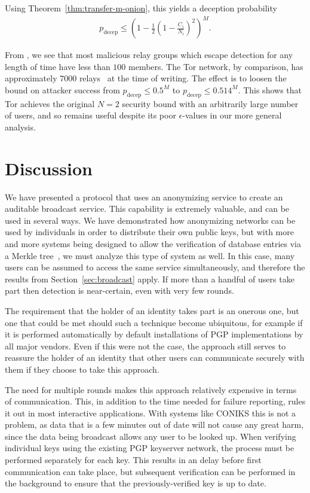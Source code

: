 \documentclass[USenglish]{llncs}
\begin{document}
Using Theorem~\ref{thm:transfer-m-onion}, this yields a deception probability
\begin{align}
	p_\mathrm{decep} \le \left( 1-\frac{1}{2}\left(1-\frac{C_i}{N_i}\right)^2 \right)^M .
\end{align}

From \cite[Table~2]{sybilhunter}, we see that most malicious relay groups
which escape detection for any length of time have less than $100$ members.
The Tor network, by comparison, has approximately $7000$ relays~\cite{tormetrics}
at the time of writing.  The effect is to loosen the bound on attacker success from
$p_\mathrm{decep} \le 0.5^{M}$ to $p_\mathrm{decep} \le 0.514^M$.  This shows that
Tor achieves the original $N=2$ security bound with an arbitrarily large number of users, and
so remains useful despite its poor $\epsilon$-values in our more general analysis.

\section{Discussion}

We have presented a protocol that uses an anonymizing service to create
an auditable broadcast service.  This capability is extremely valuable, and can
be used in several ways.  We have demonstrated how anonymizing networks
can be used by individuals in order to distribute their own public keys, but
with more and more systems being designed to allow the verification of database
entries via a Merkle tree~\cite{laurie-transparency,keybase,coniks}, we
must analyze this type of system as well.
In this case, many users can be assumed to
access the same service simultaneously, and therefore the results from
Section~\ref{sec:broadcast} apply.  If more than a handful of users take part
then detection is near-certain, even with very few rounds.

The requirement that the holder of an identity takes part is an onerous one,
but one that could be met should such a technique become ubiquitous, for
example if it is performed automatically by default installations of PGP
implementations by all major vendors.  Even if this were not the case, the
approach still serves to reassure the holder of an identity that other users
can communicate securely with them if they choose to take this approach.

The need for multiple rounds makes this approach relatively expensive in
terms of communication.  This, in addition to the time needed for
failure reporting, rules it out in most interactive applications.  With systems like
CONIKS this is not a problem, as data that is a few minutes out of date
will not cause any great harm, since the data being broadcast allows
any user to be looked up.  When verifying individual keys using the
existing PGP keyserver network, the process must be performed separately
for each key.  This results in an delay before first communication can take
place, but subsequent verification can be performed in the background to
ensure that the previously-verified key is up to date.
\end{document}
